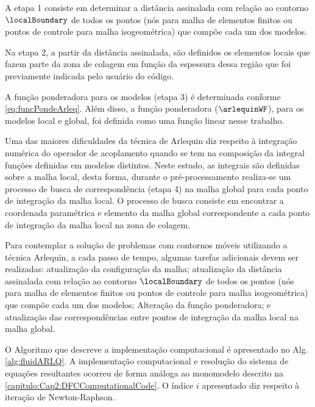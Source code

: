 A etapa 1 consiste em determinar a distância assinalada com relação ao contorno $\localBoundary$ de todos os pontos (nós para malha de elementos finitos ou pontos de controle para malha isogeométrica) que compõe cada um dos modelos.

Na etapa 2, a partir da distância assinalada, são definidos os elementos locais que fazem parte da zona de colagem em função da espessura dessa região que foi previamente indicada pelo usuário do código.

A função ponderadora para os modelos (etapa 3) é  determinada conforme \autoref{eq:funcPondeArleq}. Além disso, a função ponderadora ($\arlequinWF$), para os modelos local e global, foi definida como uma função linear nesse trabalho. 

Uma das maiores dificuldades da técnica de Arlequin diz respeito à integração numérica do operador de acoplamento quando se tem na composição da integral funções definidas em modelos distintos. Neste estudo, as integrais são definidas sobre a malha local, desta forma, durante o pré-processamento realiza-se um processo de busca de correspondência (etapa 4) na malha global para cada ponto de integração da malha local. O processo de busca consiste em encontrar a coordenada paramétrica e elemento da malha global correspondente a cada ponto de integração da malha local na zona de colagem.

Para contemplar a solução de problemas com contornos móveis utilizando a técnica Arlequin, a cada passo de tempo, algumas tarefas adicionais devem ser realizadas: atualização da configuração da malha; atualização da distância assinalada com relação ao contorno $\localBoundary$ de todos os pontos (nós para malha de elementos finitos ou pontos de controle para malha isogeométrica) que compõe cada um dos modelos;  Alteração da função ponderadora; e atualização das correspondências entre pontos de integração da malha local na malha global.

O Algoritmo que descreve a implementação computacional é apresentado no Alg. \ref{alg:fluidARLQ}. A implementação computacional e resolução do sistema de equações resultantes ocorreu de forma análoga ao monomodelo descrito na \autoref{capitulo:Cap2:DFCComputationalCode}. O índice $i$ apresentado diz respeito à iteração de Newton-Raphson.

